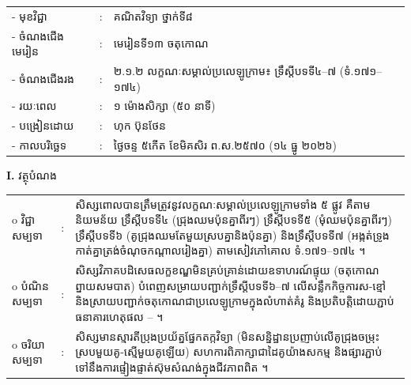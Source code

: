 \documentclass[a4paper,10pt]{article}
\newcommand{\wcirc}{{\CourierBullet\fontsize{9.5pt}{11pt}\selectfont o}}
\newcommand{\cnum}[1]{{\fontsize{10.5pt}{12pt}\selectfont\ding{\numexpr171+#1\relax}}\hspace{0.2em}}
\begin{document}
{\renewcommand{\arraystretch}{0.95}
\hspace*{4.05cm}%
\begin{tabular}{@{}l l l@{}}
  - \hspace{0.35cm} មុខវិជ្ជា & : & គណិតវិទ្យា ថ្នាក់ទី៨ \\
  - \hspace{0.35cm} ចំណងជើងមេរៀន & : & មេរៀនទី១៣ ចតុកោណ \\
  - \hspace{0.35cm} ចំណងជើងរង & : & ២.១.២ លក្ខណៈសម្គាល់ប្រលេឡូក្រាម៖ ទ្រឹស្ដីបទទី៤--៧ (ទំ.១៧១--១៧៤) \\
  - \hspace{0.35cm} រយៈពេល & : & ១ ម៉ោងសិក្សា (៥០ នាទី) \\
  - \hspace{0.35cm} បង្រៀនដោយ & : & ហុក ប៊ុនថែន \\
  - \hspace{0.35cm} កាលបរិច្ឆេទ & : & ថ្ងៃចន្ទ ៥កើត ខែមិគសិរ ព.ស.២៥៧០ (១៤ ធ្នូ ២០២៦) \\
\end{tabular}

\vspace{1pt}

\textbf{I.} {\muol វត្ថុបំណង}\\[1pt]
\hspace*{0.55cm}%
\begin{tabular}{@{}l l L{14.2cm}@{}}
  \wcirc \hspace{0.25cm} វិជ្ជាសម្បទា & : & សិស្សពោលបានត្រឹមត្រូវនូវលក្ខណៈសម្គាល់ប្រលេឡូក្រាមទាំង ៥ ផ្លូវ គឺតាមនិយមន័យ ទ្រឹស្ដីបទទី៤ (ជ្រុងឈមប៉ុនគ្នាពីរៗ) ទ្រឹស្ដីបទទី៥ (មុំឈមប៉ុនគ្នាពីរៗ) ទ្រឹស្ដីបទទី៦ (គូជ្រុងឈមតែមួយស្របគ្នានិងប៉ុនគ្នា) និងទ្រឹស្ដីបទទី៧ (អង្កត់ទ្រូងកាត់គ្នាត្រង់ចំណុចកណ្ដាលរៀងគ្នា) តាមសៀវភៅគោល ទំ.១៧១--១៧៤ ។ \\
  \wcirc \hspace{0.25cm} បំណិនសម្បទា & : & សិស្សវិភាគបដិសេធលក្ខខណ្ឌមិនគ្រប់គ្រាន់ដោយឧទាហរណ៍ផ្ទុយ (ចតុកោណព្នាយសមបាត) បំពេញសម្រាយបញ្ជាក់ទ្រឹស្ដីបទទី៦--៧ លើសន្លឹកកិច្ចការស-ខ្មៅ និងស្រាយបញ្ជាក់ចតុកោណជាប្រលេឡូក្រាមក្នុងលំហាត់គំរូ និងប្រតិបត្តិដោយភ្ជាប់ធនាគារហេតុផល \cnum{1}--\cnum{5} ។ \\
  \wcirc \hspace{0.25cm} ចរិយាសម្បទា & : & សិស្សមានស្មារតីប្រុងប្រយ័ត្នផ្នែកតក្កវិទ្យា (មិនសន្និដ្ឋានប្រញាប់លើគូជ្រុងចម្រុះស្របមួយគូ-ស្មើមួយគូឡើយ) សហការពិភាក្សាជាដៃគូយ៉ាងសកម្ម និងផ្សារភ្ជាប់ទៅនឹងការផ្ទៀងផ្ទាត់ស៊ុមសំណង់ក្នុងជីវភាពពិត ។ \\
\end{tabular}

}
\end{document}
